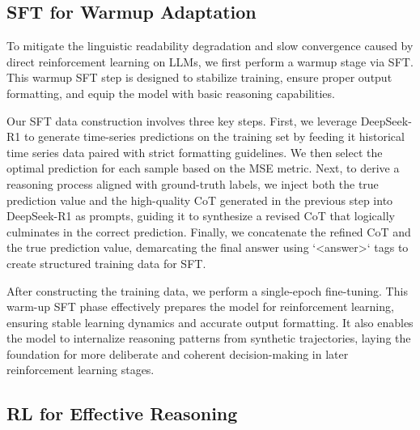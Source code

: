 \subsection{SFT for Warmup Adaptation} 
\label{SFTdata}

To mitigate the linguistic readability degradation and slow convergence caused by direct reinforcement learning on LLMs, we first perform a warmup stage via SFT. This warmup SFT step is designed to stabilize training, ensure proper output formatting, and equip the model with basic reasoning capabilities.

Our SFT data construction involves three key steps. First, we leverage DeepSeek-R1 to generate time-series predictions on the training set by feeding it historical time series data paired with strict formatting guidelines. We then select the optimal prediction for each sample based on the MSE metric. Next, to derive a reasoning process aligned with ground-truth labels, we inject both the true prediction value and the high-quality CoT generated in the previous step into DeepSeek-R1 as prompts, guiding it to synthesize a revised CoT that logically culminates in the correct prediction. Finally, we concatenate the refined CoT and the true prediction value, demarcating the final answer using `<answer>` tags to create structured training data for SFT. 

After constructing the training data, we perform a single-epoch fine-tuning. This warm-up SFT phase effectively prepares the model for  reinforcement learning, ensuring stable learning dynamics and accurate output formatting. It also enables the model to internalize reasoning patterns from synthetic trajectories, laying the foundation for more deliberate and coherent decision-making in later reinforcement learning stages.




\subsection{RL for Effective Reasoning}


